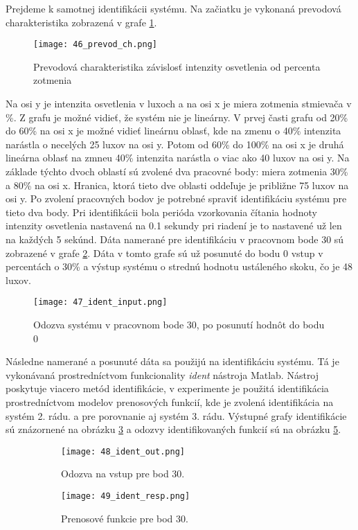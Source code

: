 \indent Prejdeme k samotnej identifikácii systému. Na začiatku je vykonaná prevodová charakteristika zobrazená v grafe \ref{46_prevod_ch}. 
\begin{figure}[!htbp]
\centering
\texttt{[image: 46\_prevod\_ch.png]}
\caption{Prevodová charakteristika závislosť intenzity osvetlenia od percenta zotmenia}
\label{46_prevod_ch}
\end{figure}
Na osi y je intenzita osvetlenia v luxoch a na osi x je miera zotmenia stmievača v \%. Z grafu je možné vidieť, že systém nie je lineárny. V prvej časti grafu od 20\% do 60\% na osi x je možné vidieť lineárnu oblasť, kde na zmenu o 40\% intenzita narástla o necelých 25 luxov na osi y. Potom  od 60\% do 100\% na osi x je druhá lineárna oblasť na zmneu 40\% intenzita narástla o viac ako 40 luxov na osi y. Na základe týchto dvoch oblastí sú zvolené dva pracovné body: miera zotmenia 30\% a 80\% na osi x. Hranica, ktorá tieto dve oblasti oddeľuje je približne 75 luxov na osi y. Po zvolení pracovných bodov je potrebné spraviť identifikáciu systému pre tieto dva body. Pri identifikácii bola perióda vzorkovania čítania hodnoty intenzity osvetlenia nastavená na 0.1 sekundy pri riadení je to nastavené už len na každých 5 sekúnd. Dáta namerané pre identifikáciu v pracovnom bode 30 sú zobrazené v grafe \ref{47_ident_input}. Dáta v tomto grafe sú už posunuté do bodu 0 vstup v percentách o 30\% a výstup systému o strednú hodnotu ustáleného skoku, čo je 48 luxov. 
\begin{figure}[!htbp]
\centering
\texttt{[image: 47\_ident\_input.png]}
\caption{Odozva systému v pracovnom bode 30, po posunutí hodnôt do bodu 0}
\label{47_ident_input}
\end{figure}
Následne namerané a posunuté dáta sa použijú na identifikáciu systému. Tá je vykonávaná prostredníctvom funkcionality \textit{ident} nástroja Matlab. Nástroj poskytuje viacero metód identifikácie, v experimente je použitá identifikácia prostredníctvom modelov prenosových funkcií, kde je zvolená identifikácia na systém 2. rádu. a pre porovnanie aj systém 3. rádu. Výstupné grafy identifikácie  sú znázornené na obrázku \ref{48_ident_out} a odozvy identifikovaných funkcií sú na obrázku \ref{49_ident_resp}.

\begin{figure}[!htbp]
\centering
\begin{subfigure}{0.5\linewidth}
\texttt{[image: 48\_ident\_out.png]}
\caption{Odozva na vstup pre bod 30.}
\label{48_ident_out}
\end{subfigure}%
\begin{subfigure}{0.5\linewidth}
\texttt{[image: 49\_ident\_resp.png]}
\caption{Prenosové funkcie pre bod 30.}
\label{49_ident_resp}
\end{subfigure}
\caption{}
\end{figure}

